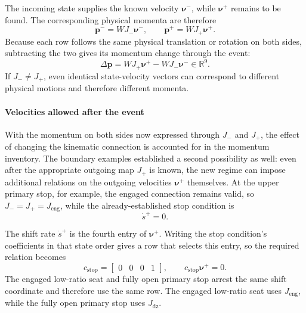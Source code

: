 \documentclass[11pt]{report}
\numberwithin{equation}{section}
\begin{document}
The incoming state supplies the known velocity \(\boldsymbol\nu^-\), while
\(\boldsymbol\nu^+\) remains to be found. The corresponding physical momenta
are therefore
\begin{equation}
    \boldsymbol p^-
    =
    WJ_-\boldsymbol\nu^-,
    \qquad
    \boldsymbol p^+
    =
    WJ_+\boldsymbol\nu^+.
    \label{eq:finite_event_side_momenta}
\end{equation}
Because each row follows the same physical translation or rotation on both
sides, subtracting the two gives its momentum change through the event:
\begin{equation}
    \Delta\boldsymbol p
    =
    WJ_+\boldsymbol{\nu}^+
    -
    WJ_-\boldsymbol{\nu}^-
    \in\mathbb{R}^{9}.
    \label{eq:finite_event_body_momentum_change}
\end{equation}
If \(J_-\neq J_+\), even identical state-velocity vectors can correspond to
different physical motions and therefore different momenta.

\paragraph{Velocities allowed after the event}

With the momentum on both sides now expressed through \(J_-\) and \(J_+\), the
effect of changing the kinematic connection is accounted for in the momentum
inventory. The boundary examples established a second possibility as well:
even after the appropriate outgoing map \(J_+\) is known, the new regime can
impose additional relations on the outgoing velocities \(\boldsymbol{\nu}^+\)
themselves. At the upper primary stop, for example, the engaged connection
remains valid, so \(J_-=J_+=J_{\mathrm{eng}}\), while the already-established
stop condition is
\begin{equation}
    \dot s^+=0.
\end{equation}

The shift rate \(\dot s^+\) is the fourth entry of \(\boldsymbol{\nu}^+\).
Writing the stop condition's coefficients in that state order gives a row that
selects this entry, so the required relation becomes
\begin{equation}
    c_{\mathrm{stop}}
    =
    \begin{bmatrix}
        0 & 0 & 0 & 1
    \end{bmatrix},
    \qquad
    c_{\mathrm{stop}}\boldsymbol{\nu}^+=0.
    \label{eq:finite_event_stop_constraint}
\end{equation}
The engaged low-ratio seat and fully open primary stop arrest the same shift
coordinate and therefore use the same row. The engaged low-ratio seat uses
\(J_{\mathrm{eng}}\), while the fully open primary stop uses
\(J_{\mathrm{dz}}\).
\end{document}
